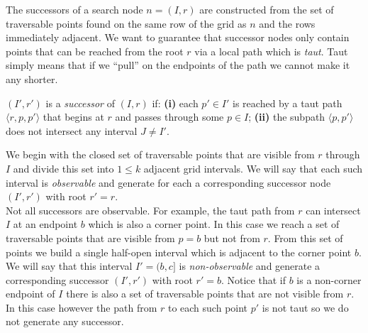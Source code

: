 The successors of a search node $n = (I, r)$ are  constructed from the 
set of traversable points found on the same row of the grid as $n$ and 
the rows immediately adjacent. 
We want to guarantee that successor nodes only contain points that
can be reached from the root $r$ via a local path which is \emph{taut}.
Taut simply means that if we ``pull'' on the endpoints of 
the path we cannot make it any shorter.

\begin{defi}
$(I', r')$ is a \emph{successor} of
$(I, r)$ if: \textbf{(i)} each $p' \in I'$ is reached
by a taut path $\langle r, p,  p' \rangle$ that begins
at $r$ and passes through some $p \in I$;
\textbf{(ii)} the subpath $\langle p, p' \rangle$ does not intersect any 
interval $J \neq I'$.
\end{defi}
We begin with the closed set of traversable points that are 
visible from $r$ through $I$ and divide this set into $1 \leq k$
adjacent grid intervals.
We will say that each such interval is \emph{observable} and 
generate for each a corresponding successor node 
$(I', r')$ with root $r' = r$.
\\
Not all successors are observable.
For example, the taut path from $r$ can intersect 
$I$ at an endpoint $b$ which is also a corner point.
In this case we reach a set of traversable points that
are visible from $p = b$ but not from $r$.
From this set of points we build a single half-open 
interval which is adjacent to the corner point $b$.
We will say that this interval $I' = (b, c]$ is 
\emph{non-observable} and generate a corresponding successor 
$(I', r')$ with root $r' = b$.  
Notice that if $b$ is a non-corner endpoint of $I$ there 
is also a set of traversable points that are not visible from $r$.
In this case however the path from $r$ to each such point $p'$ is 
not taut so we do not generate any successor.

%



